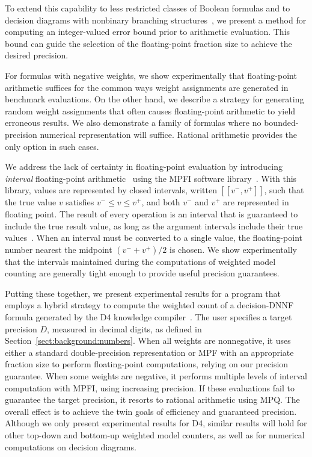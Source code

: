\documentclass[
hf
]{ceurart}
\newcommand{\vmin}{v^{-}}
\newcommand{\vmax}{v^{+}}
\newcommand{\interval}[1]{[\![#1]\!]}
\begin{document}
To extend this capability to less restricted classes of Boolean
formulas and to decision diagrams with nonbinary branching
structures~\cite{darwiche:ijcai:2011,srinivasan:iccad:1990}, we
present a method for computing an integer-valued error bound prior to arithmetic
evaluation.  This bound can guide the selection of the floating-point fraction size to
achieve the desired precision.

For formulas with negative weights, 
we show experimentally that floating-point
arithmetic suffices for the common ways weight assignments are generated in benchmark evaluations.
On the other hand, we
describe a strategy for generating random weight assignments that
often causes floating-point arithmetic to yield erroneous results.
We also
demonstrate a family of
formulas where no bounded-precision numerical representation will
suffice.  Rational arithmetic provides the only option in such cases.


We address the lack of certainty in floating-point
evaluation by introducing \emph{interval} floating-point
arithmetic~\cite{hickey:jacm:2001} using the MPFI software
library~\cite{revol:rc:2005}. With this library, values are
represented by closed intervals, written $\interval{\vmin, \vmax}$, such that the
true value $v$ satisfies $\vmin \leq v \leq \vmax$, and both $\vmin$ and $\vmax$ are
represented in floating point.  The result of every operation is an
interval that is guaranteed to include the true result value, as long
as the argument intervals include their true values~\cite{hickey:jacm:2001,muller:hfpa:2018}.
When an interval must be converted to a single value, the floating-point number nearest the midpoint $(\vmin+\vmax)/2$ is chosen.
We show
experimentally that the intervals maintained during the computations
of weighted model counting are generally tight enough to provide
useful precision guarantees.

Putting these together, we present experimental results for a program
that employs a hybrid strategy to compute the weighted count of a decision-DNNF formula
generated by the D4 knowledge compiler~\cite{lagniez:ijcai:2017}.
The user specifies a target precision $D$, measured in decimal digits, as defined in Section~\ref{sect:background:numbers}.
When all weights are nonnegative, it uses either a standard double-precision representation or MPF with an appropriate fraction size to
perform floating-point computations, relying on our precision
guarantee.  When some weights are negative, it performs multiple levels
of interval computation with MPFI, using increasing precision.  If these evaluations fail to guarantee the target precision,
it resorts to rational arithmetic using MPQ\@.  The overall effect
is to achieve the twin goals of efficiency and guaranteed precision.
Although we only present experimental results for D4, similar results will hold for other top-down and bottom-up weighted model counters, as well as
for numerical computations on decision diagrams.
\end{document}
